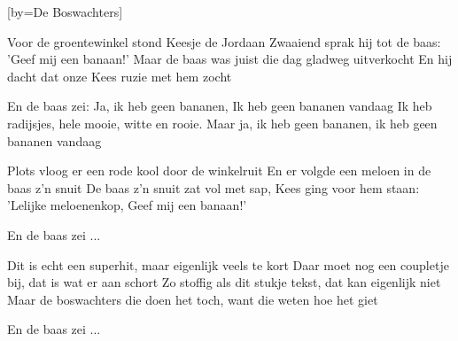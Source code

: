  

[by=De Boswachters]



\beginverse
Voor de groentewinkel stond Keesje de Jordaan
Zwaaiend sprak hij tot de baas: 'Geef mij een banaan!'
Maar de baas was juist die dag gladweg uitverkocht
En hij dacht dat onze Kees ruzie met hem zocht
\endverse

\beginchorus
En de baas zei:
Ja, ik heb geen bananen,
Ik heb geen bananen vandaag
Ik heb radijsjes, hele mooie, witte en rooie.
Maar ja, ik heb geen bananen,
ik heb geen bananen vandaag
\endchorus

\beginverse
Plots vloog er een rode kool door de winkelruit
En er volgde een meloen in de baas z'n snuit
De baas z'n snuit zat vol met sap,
Kees ging voor hem staan:
'Lelijke meloenenkop, Geef mij een banaan!'
\endverse

\beginchorus
En de baas zei ...
\endchorus

\beginverse
Dit is echt een superhit, maar eigenlijk veels te kort
Daar moet nog een coupletje bij, dat is wat er aan schort
Zo stoffig als dit stukje tekst, dat kan eigenlijk niet
Maar de boswachters die doen het toch, want die weten hoe het giet
\endverse

\beginchorus
En de baas zei ...
\endchorus







\endsong
